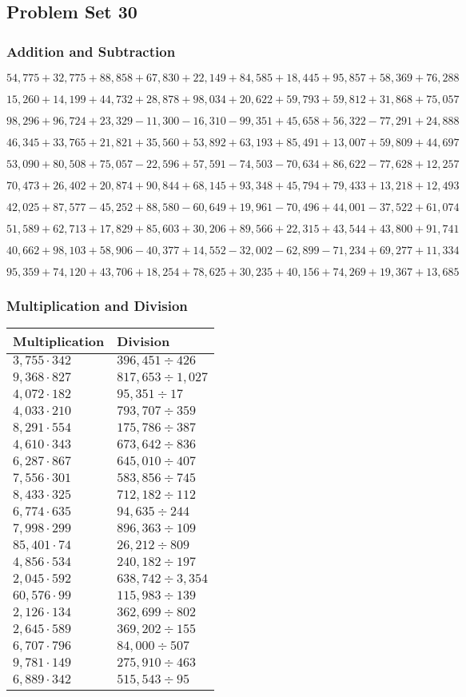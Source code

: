 \hypertarget{problem-set-30-4}{%
\subsection{Problem Set 30}\label{problem-set-30-4}}

\hypertarget{addition-and-subtraction-252}{%
\subsubsection{Addition and
Subtraction}\label{addition-and-subtraction-252}}

\(54,775+32,775+88,858+67,830+22,149+84,585+18,445+95,857+58,369+ 76,288\)

\(15,260+14,199+44,732+28,878+98,034+20,622+59,793+59,812+31,868+75,057\)

\(98,296+96,724+23,329-11,300-16,310-99,351+45,658+56,322-77,291+24,888\)

\(46,345+33,765+21,821+35,560+53,892+63,193+85,491+13,007+59,809+44,697\)

\(53,090+80,508+75,057-22,596+57,591-74,503-70,634+86,622-77,628+12,257\)

\(70,473+26,402+20,874+90,844+68,145+93,348+45,794+79,433+13,218+12,493\)

\(42,025+87,577-45,252+88,580-60,649+19,961-70,496+44,001-37,522+61,074\)

\(51,589+62,713+17,829+85,603+30,206+89,566+22,315+43,544+43,800+91,741\)

\(40,662+98,103+58,906-40,377+14,552-32,002-62,899-71,234+69,277+11,334\)

\(95,359+74,120+43,706+18,254+78,625+30,235+40,156+74,269+19,367+13,685\)

\hypertarget{multiplication-and-division-251}{%
\subsubsection{Multiplication and
Division}\label{multiplication-and-division-251}}

\begin{longtable}[]{@{}ll@{}}
\toprule
Multiplication & Division\tabularnewline
\midrule
\endhead
\(3,755\cdot342\) & \(396,451÷426\)\tabularnewline
\(9,368\cdot827\) & \(817,653÷1,027\)\tabularnewline
\(4,072\cdot182\) & \(95,351÷17\)\tabularnewline
\(4,033\cdot210\) & \(793,707÷359\)\tabularnewline
\(8,291\cdot554\) & \(175,786÷387\)\tabularnewline
\(4,610\cdot343\) & \(673,642÷836\)\tabularnewline
\(6,287\cdot867\) & \(645,010÷407\)\tabularnewline
\(7,556\cdot301\) & \(583,856÷745\)\tabularnewline
\(8,433\cdot325\) & \(712,182÷112\)\tabularnewline
\(6,774\cdot635\) & \(94,635÷244\)\tabularnewline
\(7,998\cdot299\) & \(896,363÷109\)\tabularnewline
\(85,401\cdot74\) & \(26,212÷809\)\tabularnewline
\(4,856\cdot534\) & \(240,182÷197\)\tabularnewline
\(2,045\cdot592\) & \(638,742÷3,354\)\tabularnewline
\(60,576\cdot99\) & \(115,983÷139\)\tabularnewline
\(2,126\cdot134\) & \(362,699÷802\)\tabularnewline
\(2,645\cdot589\) & \(369,202÷155\)\tabularnewline
\(6,707\cdot796\) & \(84,000÷507\)\tabularnewline
\(9,781\cdot149\) & \(275,910÷463\)\tabularnewline
\(6,889\cdot342\) & \(515,543÷95\)\tabularnewline
\bottomrule
\end{longtable}

